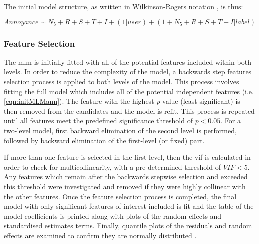 The initial model structure, as written in Wilkinson-Rogers notation \citep{Wilkinson1973Symbolic}, is thus:

\begin{equation}
  \label{eqn:initMLMann}
      Annoyance \sim N_5 + R + S + T + I + (1 | user) + (1 + N_5 + R + S + T + I | label)
  \end{equation}

\subsubsection{Feature Selection}

The \gls{mlm} is initially fitted with all of the potential features included within both levels. In order to reduce the complexity of the model, a backwards step features selection process is applied to both levels of the model. This process involves fitting the full model which includes all of the potential independent features (i.e. \cref{eqn:initMLMann}). The feature with the highest \emph{p}-value (least significant)\footnotemark{} is then removed from the candidates and the model is refit. This process is repeated until all features meet the predefined significance threshold of $p < 0.05 $. For a two-level model, first backward elimination of the second level is performed, followed by backward elimination of the first-level (or fixed) part.



If more than one feature is selected in the first-level, then the \gls{vif} is calculated in order to check for multicollinearity, with a pre-determined threshold of ${VIF}<5$. Any features which remain after the backwards stepwise selection and exceeded this threshold were investigated and removed if they were highly collinear with the other features. Once the feature selection process is completed, the final model with only significant features of interest included is fit and the table of the model coefficients is printed along with plots of the random effects and standardised estimates terms. Finally, quantile plots of the residuals and random effects are examined to confirm they are normally distributed \citep{Harrison2018brief}.


